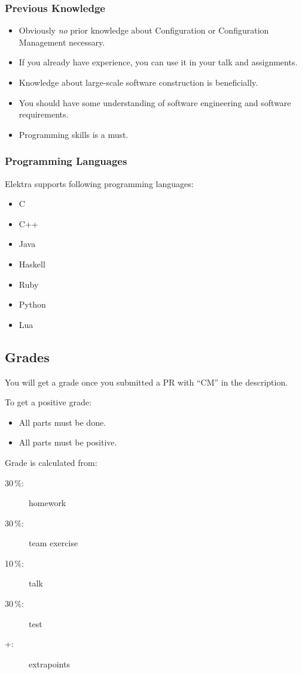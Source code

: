 \begin{frame}
	\frametitle{Previous Knowledge}
	\begin{itemize}
		\item Obviously \textit{no} prior knowledge about Configuration or Configuration Management necessary.
		\item If you already have experience, you can use it in your talk and assignments.
		\item Knowledge about large-scale software construction is beneficially.
		\item You should have some understanding of software engineering and software requirements.
		\item Programming skills is a must.
	\end{itemize}
\end{frame}

\begin{frame}
	\frametitle{Programming Languages}
	Elektra supports following programming languages:
	\begin{itemize}
		\item C
		\item C++
		\item Java
		\item Haskell
		\item Ruby
		\item Python
		\item Lua
	\end{itemize}
\end{frame}

\subsection{Grades}

\begin{frame}
	You will get a grade once you submitted a PR with ``CM'' in the description.
	\vspace{1cm}

	To get a positive grade:
	\begin{itemize}
		\item All parts must be done.
		\item All parts must be positive.
	\end{itemize}
\end{frame}

\begin{frame}
	Grade is calculated from:
	\begin{description}
	\item[30\,\%:] homework
	\item[30\,\%:] team exercise
	\item[10\,\%:] talk
	\item[30\,\%:] test
	\item[+:] extrapoints
	\end{description}
\end{frame}

